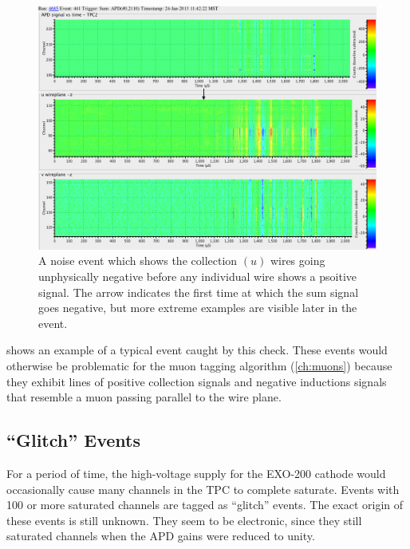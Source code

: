 \documentclass[herrin-thesis.tex]{subfiles}
\begin{document}
\begin{figure}[tbp]
\centering
\includegraphics[width=\columnwidth]{./plots/noise_eventdisplay_run_4685_ev_0441_annotated.png}
\caption[Collection wires negative noise]{A noise event which shows the collection \((u)\) wires going unphysically negative before any individual wire shows a psoitive signal. The arrow indicates the first time at which the sum signal goes negative, but more extreme examples are visible later in the event.}
\label{fig:noise_sum_u_neg}
\end{figure}

 shows an example of a typical event caught by this check. These events would otherwise be problematic for the muon tagging algorithm (\cref{ch:muons}) because they exhibit lines of positive collection signals and negative inductions signals that resemble a muon passing parallel to the wire plane.

\subsection{``Glitch'' Events}
For a period of time, the high-voltage supply for the EXO-200 cathode would occasionally cause many channels in the TPC to complete saturate. Events with 100 or more saturated channels are tagged as ``glitch'' events. The exact origin of these events is still unknown. They seem to be electronic, since they still saturated channels when the APD gains were reduced to unity.
\end{document}
